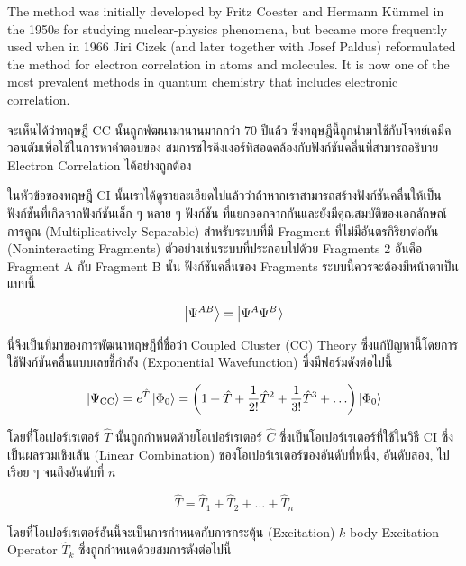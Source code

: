 \begin{displayquote}
  The method was initially developed by Fritz Coester and Hermann Kümmel in the 1950s for studying
  nuclear-physics phenomena, but became more frequently used when in 1966 Jiri Cizek (and later together
  with Josef Paldus) reformulated the method for electron correlation in atoms and molecules.
  It is now one of the most prevalent methods in quantum chemistry that includes electronic correlation.
\end{displayquote}

\noindent จะเห็นได้ว่าทฤษฎี CC นั้นถูกพัฒนามานานมากกว่า 70 ปีแล้ว ซึ่งทฤษฎีนี้ถูกนำมาใช้กับโจทย์เคมีควอนตัมเพื่อใช้ในการหาคำตอบของ%
สมการชโรดิงเงอร์ที่สอดคล้องกับฟังก์ชันคลื่นที่สามารถอธิบาย Electron Correlation ได้อย่างถูกต้อง

ในหัวข้อของทฤษฎี CI นั้นเราได้ดูรายละเอียดไปแล้วว่าถ้าหากเราสามารถสร้างฟังก์ชันคลื่นให้เป็นฟังก์ชันที่เกิดจากฟังก์ชันเล็ก ๆ หลาย ๆ ฟังก์ชัน%
ที่แยกออกจากกันและยังมีคุณสมบัติของเอกลักษณ์การคูณ (Multiplicatively Separable) สำหรับระบบที่มี Fragment ที่ไม่มีอันตรกิริยาต่อกัน
(Noninteracting Fragments) ตัวอย่างเช่นระบบที่ประกอบไปด้วย Fragments 2 อันคือ Fragment A กับ Fragment B นั้น ฟังก์ชันคลื่นของ
Fragments ระบบนี้ควรจะต้องมีหน้าตาเป็นแบบนี้

\begin{equation}
  \ket{\Psi^{AB}} = \ket{\Psi^A\Psi^B}
\end{equation}

นี่จึงเป็นที่มาของการพัฒนาทฤษฎีที่ชื่อว่า Coupled Cluster (CC) Theory ซึ่งแก้ปัญหานี้โดยการใช้ฟังก์ชันคลื่นแบบเลขชี้กำลัง (Exponential
Wavefunction) ซึ่งมีฟอร์มดังต่อไปนี้

\begin{equation}
  \ket{\Psi_{\mathrm{CC}}}
  = e^{\hat{T}} \ket{\Phi_0}
  = \left(1 + \hat{T} + \frac{1}{2!}\hat{T}^2 + \frac{1}{3!}\hat{T}^3 + \ldots \right)\ket{\Phi_0}
\end{equation}

\noindent โดยที่โอเปอร์เรเตอร์ $\hat{T}$ นั้นถูกกำหนดด้วยโอเปอร์เรเตอร์ $\hat{C}$ ซึ่งเป็นโอเปอร์เรเตอร์ที่ใช้ในวิธี CI ซึ่งเป็นผลรวมเชิงเส้น
(Linear Combination) ของโอเปอร์เรเตอร์ของอันดับที่หนึ่ง, อันดับสอง, ไปเรื่อย ๆ จนถึงอันดับที่ $n$

\begin{equation}
  \hat{T} = \hat{T}_1 + \hat{T}_2 + \ldots + \hat{T}_n
\end{equation}

\noindent โดยที่โอเปอร์เรเตอร์อันนี้จะเป็นการกำหนดกับการกระตุ้น (Excitation) $k$-body Excitation Operator $\hat{T}_k$
ซึ่งถูกกำหนดด้วยสมการดังต่อไปนี้

